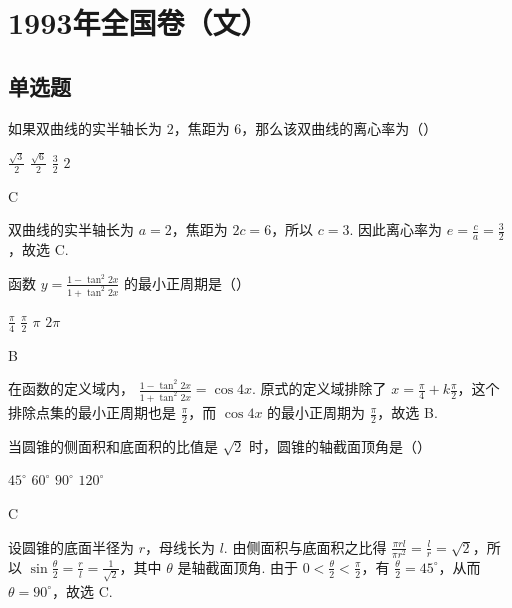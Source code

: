 \chapter{1993年全国卷（文）}
\section{单选题}

\begin{problem}
如果双曲线的实半轴长为 \(2\)，焦距为 \(6\)，那么该双曲线的离心率为（\quad）

\choices
    {\(\frac{\sqrt{3}}{2}\)}
    {\(\frac{\sqrt{6}}{2}\)}
    {\(\frac{3}{2}\)}
    {\(2\)}
\end{problem}

\begin{answer}
C
\end{answer}

\begin{solution}
双曲线的实半轴长为 \(a=2\)，焦距为 \(2c=6\)，所以 \(c=3\). 因此离心率为 \(e=\frac{c}{a}=\frac{3}{2}\)，故选 C.
\end{solution}

\begin{problem}
函数 \(y = \frac{1 - \tan^2 2x}{1 + \tan^2 2x} \) 的最小正周期是（\quad）

\choices
    {\(\frac{\pi}{4}\)}
    {\(\frac{\pi}{2}\)}
    {\(\pi\)}
    {\(2\pi\)}
\end{problem}

\begin{answer}
B
\end{answer}

\begin{solution}
在函数的定义域内，
\(\displaystyle \frac{1-\tan^2 2x}{1+\tan^2 2x}=\cos 4x\). 原式的定义域排除了 \(x=\frac{\pi}{4}+k\frac{\pi}{2}\)，这个排除点集的最小正周期也是 \(\frac{\pi}{2}\)，而 \(\cos 4x\) 的最小正周期为 \(\frac{\pi}{2}\)，故选 B.
\end{solution}

\begin{problem}
当圆锥的侧面积和底面积的比值是 \(\sqrt{2}\) 时，圆锥的轴截面顶角是（\quad）

\choices
    {\(45^{\circ}\)}
    {\(60^{\circ}\)}
    {\(90^{\circ}\)}
    {\(120^{\circ}\)}
\end{problem}

\begin{answer}
C
\end{answer}

\begin{solution}
设圆锥的底面半径为 \(r\)，母线长为 \(l\). 由侧面积与底面积之比得
\(\displaystyle \frac{\pi rl}{\pi r^2}=\frac{l}{r}=\sqrt{2}\)，所以 \(\sin\frac{\theta}{2}=\frac{r}{l}=\frac{1}{\sqrt{2}}\)，其中 \(\theta\) 是轴截面顶角. 由于 \(0<\frac{\theta}{2}<\frac{\pi}{2}\)，有 \(\frac{\theta}{2}=45^\circ\)，从而 \(\theta=90^\circ\)，故选 C.
\end{solution}

